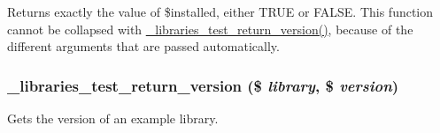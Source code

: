 Returns exactly the value of \$installed, either TRUE or FALSE. This function cannot be collapsed with \hyperlink{libraries__test_8module_adb9e4bcd0364b383e2b4e63322c59515}{\_\-libraries\_\-test\_\-return\_\-version()}, because of the different arguments that are passed automatically. \hypertarget{libraries__test_8module_adb9e4bcd0364b383e2b4e63322c59515}{
\subsubsection[{\_\-libraries\_\-test\_\-return\_\-version}]{\setlength{\rightskip}{0pt plus 5cm}\_\-libraries\_\-test\_\-return\_\-version (\$ {\em library}, \/  \$ {\em version})}}
\label{libraries__test_8module_adb9e4bcd0364b383e2b4e63322c59515}
Gets the version of an example library.

